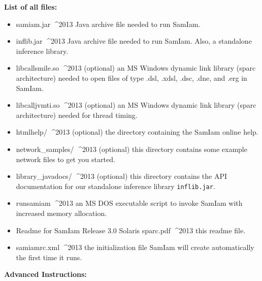 \documentclass[10pt]{report}
\newcommand{\samiamversion}{3.0}
\newcommand{\architecture}{sparc}
\newcommand{\operatingsystem}{Solaris}
\newcommand{\fylenamecallsmile}{libcallsmile.so}
\newcommand{\fylenameprofiler}{libcalljvmti.so}
\newcommand{\fileseparator}{/}
\newcommand{\fylenamerunscript}{runsamiam}
\newcommand{\architecture}{i386}
\newcommand{\operatingsystem}{Mac OS X}
\newcommand{\fylenamecallsmile}{libcallsmile.jnilib}
\newcommand{\fylenameprofiler}{libcalljvmti.jnilib}
\newcommand{\fileseparator}{/}
\newcommand{\fylenamerunscript}{runsamiam}
\newcommand{\architecture}{amd64}
\newcommand{\architecture}{i386}
\newcommand{\operatingsystem}{Linux}
\newcommand{\fylenamecallsmile}{libcallsmile.so}
\newcommand{\fylenameprofiler}{libcalljvmti.so}
\newcommand{\fileseparator}{/}
\newcommand{\fylenamerunscript}{runsamiam}
\newcommand{\architecture}{amd64}
\newcommand{\architecture}{i386}
\newcommand{\operatingsystem}{Windows}
\newcommand{\fylenamecallsmile}{callsmile.dll}
\newcommand{\fylenameprofiler}{calljvmti.dll}
\newcommand{\fileseparator}{\textbackslash}
\newcommand{\fylenamerunscript}{samiam.bat}
\newcommand{\scriptdescription}{an MS DOS executable}
\newcommand{\librarydescription}{an MS Windows dynamic link}
\newcommand{\scriptdescription}{a shell}
\newcommand{\librarydescription}{a {\operatingsystem} shared object}
\begin{document}
\textbf{List of all files:}
\begin{itemize}[noitemsep,topsep=0mm,leftmargin=*]
\item samiam.jar ^^^^2013 Java archive file needed to run SamIam.
\item inflib.jar ^^^^2013 Java archive file needed to run SamIam.  Also, a standalone inference library.
\item {\fylenamecallsmile} ^^^^2013 (optional) {\librarydescription} library ({\architecture} architecture) needed to open files of type .dsl, .xdsl, .dsc, .dne, and .erg in SamIam.
\item {\fylenameprofiler} ^^^^2013 (optional) {\librarydescription} library ({\architecture} architecture) needed for thread timing.
\item htmlhelp{\fileseparator} ^^^^2013 (optional) the directory containing the SamIam online help.
\item network\_samples{\fileseparator} ^^^^2013 (optional) this directory contains some example network files to get you started.
\item library\_javadocs{\fileseparator} ^^^^2013 (optional) this directory contains the API documentation for our standalone inference library \texttt{inflib.jar}.
\item {\fylenamerunscript} ^^^^2013 {\scriptdescription} script to invoke SamIam with increased memory allocation.
\item Readme for SamIam Release {\samiamversion} {\operatingsystem} {\architecture}.pdf ^^^^2013 this readme file.
\item samiamrc.xml ^^^^2013 the initialization file SamIam will create automatically the first time it runs.
\end{itemize}

\textbf{Advanced Instructions:}
\end{document}
